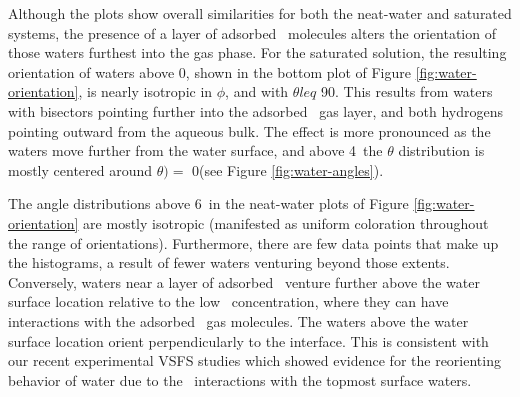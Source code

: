 
Although the plots show overall similarities for both the neat-water and saturated systems, the presence of a layer of adsorbed \suldiox~molecules alters the orientation of those waters furthest into the gas phase. For the saturated solution, the resulting orientation of waters above 0\angs, shown in the bottom plot of Figure \ref{fig:water-orientation}, is nearly isotropic in $\phi$, and with $\theta leq$ 90\textdegree. This results from waters with bisectors pointing further into the adsorbed \suldiox~gas layer, and both hydrogens pointing outward from the aqueous bulk. The effect is more pronounced as the waters move further from the water surface, and above 4\angs~the $\theta$ distribution is mostly centered around $\theta)=$ 0\textdegree (see Figure \ref{fig:water-angles}).


The angle distributions above 6\angs~in the neat-water plots of Figure \ref{fig:water-orientation} are mostly isotropic (manifested as uniform coloration throughout the range of orientations). Furthermore, there are few data points that make up the histograms, a result of fewer waters venturing beyond those extents. Conversely, waters near a layer of adsorbed \suldiox~venture further above the water surface location relative to the low \suldiox~concentration, where they can have interactions with the adsorbed \suldiox~gas molecules. The waters above the water surface location orient perpendicularly to the interface. This is consistent with our recent experimental VSFS studies which showed evidence for the reorienting behavior of water due to the \suldiox~interactions with the topmost surface waters.\cite{Ota2011}

